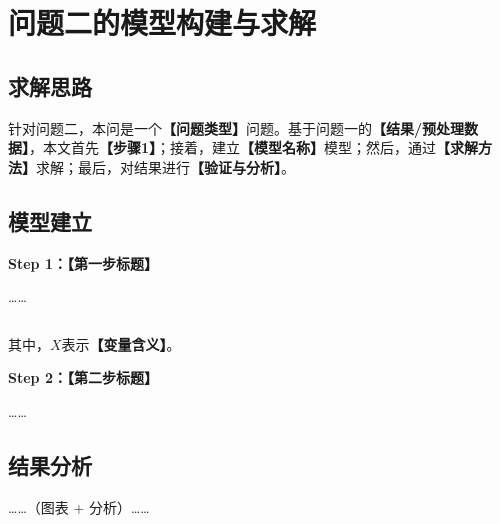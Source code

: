 
\section{问题二的模型构建与求解}

\subsection{求解思路}

针对问题二，本问是一个\textbf{【问题类型】}问题。基于问题一的\textbf{【结果/预处理数据】}，本文首先\textbf{【步骤1】}；接着，建立\textbf{【模型名称】}模型；然后，通过\textbf{【求解方法】}求解；最后，对结果进行\textbf{【验证与分析】}。

\subsection{模型建立}

\textbf{Step 1：【第一步标题】}

……

\begin{equation}
\end{equation}

其中，$X$表示\textbf{【变量含义】}。

\textbf{Step 2：【第二步标题】}

……

\subsection{结果分析}

……（图表 + 分析）……
